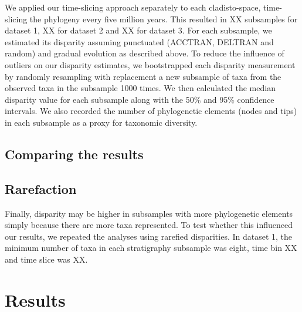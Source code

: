 \documentclass[12pt,a4paper]{article}
\begin{document}
We applied our time-slicing approach separately to each cladisto-space, time-slicing the phylogeny every five million years.
This resulted in XX subsamples for dataset 1, XX for dataset 2 and XX for dataset 3.
For each subsample, we estimated its disparity assuming punctuated (ACCTRAN, DELTRAN and random) and gradual evolution as described above.
To reduce the influence of outliers on our disparity estimates, we bootstrapped each disparity measurement by randomly resampling with replacement a new subsample of taxa from the observed taxa in the subsample 1000 times.
We then calculated the median disparity value for each subsample along with the 50\% and 95\% confidence intervals.
We also recorded the number of phylogenetic elements (nodes and tips) in each subsample as a proxy for taxonomic diversity.

\subsection{Comparing the results}


\subsection{Rarefaction} 

Finally, disparity may be higher in subsamples with more phylogenetic elements simply because there are more taxa represented.
To test whether this influenced our results, we repeated the analyses using rarefied disparities.
In dataset 1, the minimum number of taxa in each stratigraphy subsample was eight, time bin XX and time slice was XX.


	
\section{Results} 



	
\end{document}
